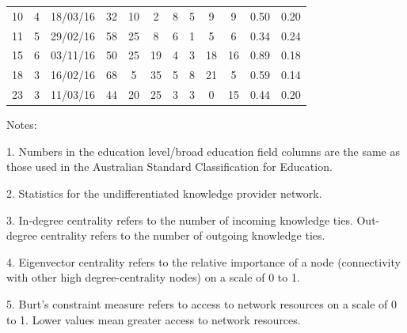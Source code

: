 \begin{landscape}
\begin{table}[]
\begin{threeparttable}
\begin{tabular}{@{}cccccccccccc@{}}
				10       & 4   &  18/03/16     	& 32  & 10     & 2  	& 8      & 5   & 9  	& 9   & 0.50   & 0.20    \\
				11       & 5   &  29/02/16     	& 58  & 25     & 8  	& 6      & 1   & 5  	& 6   & 0.34   & 0.24    \\
				15       & 6   &  03/11/16     	  	& 50  & 25     & 19  	& 4      & 3   & 18   	& 16  & 0.89   & 0.18    \\
				18       & 3   &  16/02/16     	& 68  & 5      & 35  	& 5      & 8   & 21   	& 5   & 0.59   & 0.14    \\
				23       & 3   &  11/03/16     	& 44  & 20     & 25  	& 3      & 3   & 0  	& 15  & 0.44   & 0.20    \\ \bottomrule
			\end{tabular}
			 \begin{tablenotes}
			 	\small
			 	\item Notes:
			 	\item 1. Numbers in the education level/broad education field columns are the same as those used in the Australian Standard Classification for Education.
			 	\item 2. Statistics for the undifferentiated knowledge provider network.
			 	\item 3. In-degree centrality refers to the number of incoming knowledge ties. Out-degree centrality refers to the number of outgoing knowledge ties.
			 	\item 4. Eigenvector centrality refers to the relative importance of a node (connectivity with other high degree-centrality nodes) on a scale of 0 to 1.
			 	\item 5. Burt's constraint measure refers to access to network resources on a scale of 0 to 1. Lower values mean greater access to network resources.
			 \end{tablenotes}
		\end{threeparttable}
	\end{table}
\end{landscape}
 
